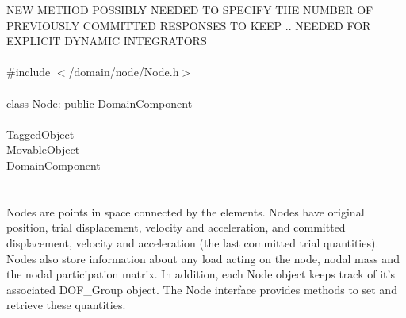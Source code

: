 
NEW METHOD POSSIBLY NEEDED TO SPECIFY THE NUMBER OF PREVIOUSLY
COMMITTED RESPONSES TO KEEP .. NEEDED FOR EXPLICIT DYNAMIC INTEGRATORS\\

   \\
\indent \#include $<$/domain/node/Node.h$>$  \\

  \\
\indent class Node: public DomainComponent  \\

 \\
\indent TaggedObject \\
\indent MovableObject \\
\indent\indent DomainComponent \\
\indent\indent{} \\

  \\
\indent Nodes are points in space connected by the elements. Nodes
have original position, trial displacement, velocity and acceleration, 
and committed displacement, velocity and acceleration (the last
committed trial quantities). Nodes also store information about any
load acting on the node, nodal mass and the nodal participation
matrix. In addition, each Node object keeps track of it's associated
DOF\_Group object. The Node interface provides methods to set and
retrieve these quantities.\\  



